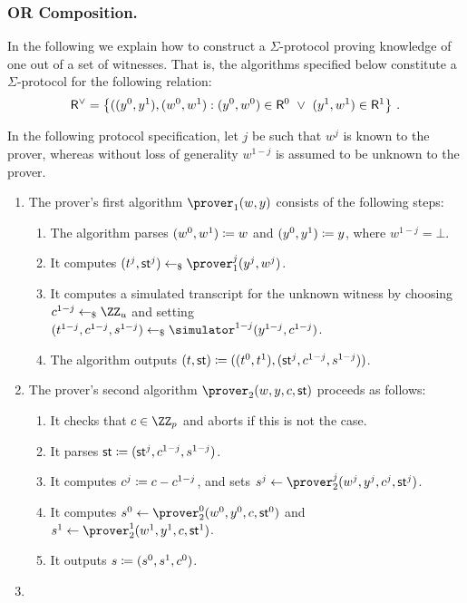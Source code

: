\documentclass[runningheads]{llncs}
\begin{document}
\subsubsection{OR Composition.}
  In the following we explain how to construct a $\Sigma$-protocol proving knowledge of one out of a set of witnesses.
  That is, the algorithms specified below constitute a $\Sigma$-protocol for the following relation:
$$
  \mathsf{R}^\lor = \left\{ ((y^0,y^1),(w^0,w^1) : (y^0,w^0)\in \mathsf{R}^0 ~\lor~ (y^1,w^1)\in\mathsf{R}^1\right\}\,.
$$

  In the following protocol specification, let $j$ be such that $w^j$ is known to the prover, whereas without loss of generality $w^{1-j}$ is assumed to be unknown to the prover.
\begin{enumerate}
  \item
    The prover's first algorithm $\prover_1(w,y)$ consists of the following steps:
    \begin{enumerate}
      \item
        The algorithm parses $(w^0,w^1)\coloneqq w$ and $(y^0,y^1)\coloneqq y$, where $w^{1-j}=\bot$.
      \item
        It computes $(t^j,\st^j)\getsr\prover_1^j(y^j,w^j)$.
      \item
        It computes a simulated transcript for the unknown witness by choosing $c^{1-j}\getsr\ZZ_u$ and setting $(t^{1-j},c^{1-j},s^{1-j})\getsr\simulator^{1-j}(y^{1-j},c^{1-j})$.
      \item
	The algorithm outputs $(t,\mathsf{st}) \coloneqq ((t^0,t^1),(\mathsf{st}^j,c^{1-j},s^{1-j}))$.
    \end{enumerate}
  \item
    The prover's second algorithm $\prover_2(w,y,c,\st)$ proceeds as follows:
    \begin{enumerate}
      \item
        It checks that $c\in\ZZ_p$ and aborts if this is not the case.
      \item
	It parses $\mathsf{st}\coloneqq(\mathsf{st}^j,c^{1-j},s^{1-j})$.
      \item
        It computes $c^j\coloneqq c-c^{1-j}$, and sets $s^j\gets\prover_2^j(w^j,y^j,c^j,\st^j)$.
      \item
        It computes $s^0\gets\prover_2^0(w^0,y^0,c,\st^0)$ and $s^1\gets\prover_2^1(w^1,y^1,c,\st^1)$.
      \item
        It outputs $s\coloneqq(s^0,s^1,c^0)$.
    \end{enumerate}
  \item

\end{enumerate}
\end{document}
